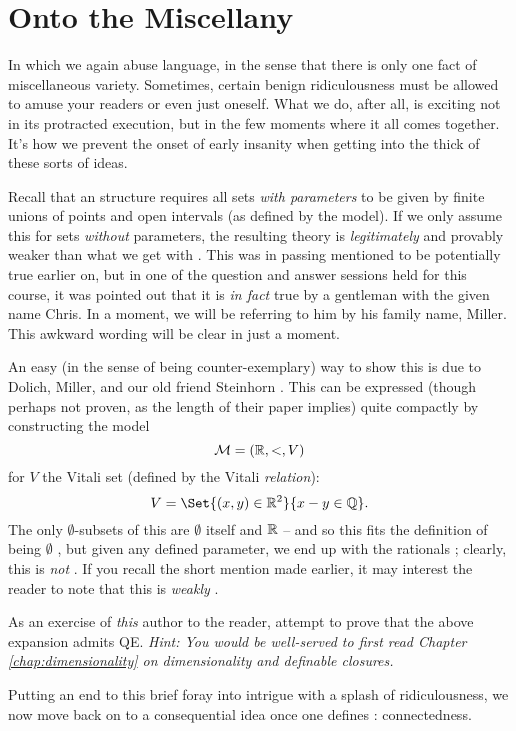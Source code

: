\section{Onto the Miscellany}

In which we again abuse language, in the sense that there is only one fact of miscellaneous variety. Sometimes, certain benign ridiculousness must be allowed to amuse your readers or even just oneself. What we do, after all, is exciting not in its protracted execution, but in the few moments where it all comes together. It's how we prevent the onset of early insanity when getting into the thick of these sorts of ideas.

\begin{remark}
  Recall that an \om structure requires all  sets \emph{with parameters} to be given by finite unions of points and open intervals (as defined by the model). If we only assume this for sets  \emph{without} parameters, the resulting theory is \emph{legitimately} and provably weaker than what we get with \omy. This was in passing mentioned to be potentially true earlier on, but in one of the question and answer sessions held for this course, it was pointed out that it is \emph{in fact} true by a gentleman with the given name Chris. In a moment, we will be referring to him by his family name, Miller. This awkward wording will be clear in just a moment.

  An easy (in the sense of being counter-exemplary) way to show this is due to Dolich, Miller, and our old friend Steinhorn \cite{dolich_structures_2009}. This can be expressed (though perhaps not proven, as the length of their paper implies) quite compactly by constructing the model
  $$
    \mathcal{M} = (\mathbb{R}, <, V)
  $$
  for $V$ the Vitali set (defined by the Vitali \emph{relation}):
  $$
    V = \Set{(x, y) \in \R^2}{x - y \in \Q}.
  $$
  The only $\emptyset$- subsets of this are $\emptyset$ itself and $\mathbb{R}$ -- and so this fits the definition of being $\emptyset$ \om, but given any defined parameter, we end up with the rationals ; clearly, this is \emph{not} \om. If you recall the short mention made earlier, it may interest the reader to note that this is \emph{weakly} \om.

  \begin{exercise}
    As an exercise of \emph{this} author to the reader, attempt to prove that the above expansion admits QE. \textit{Hint: You would be well-served to first read Chapter \ref{chap:dimensionality} on dimensionality and definable closures.}
  \end{exercise}
\end{remark}

Putting an end to this brief foray into intrigue with a splash of ridiculousness, we now move back on to a consequential idea once one defines \cds: connectedness.

